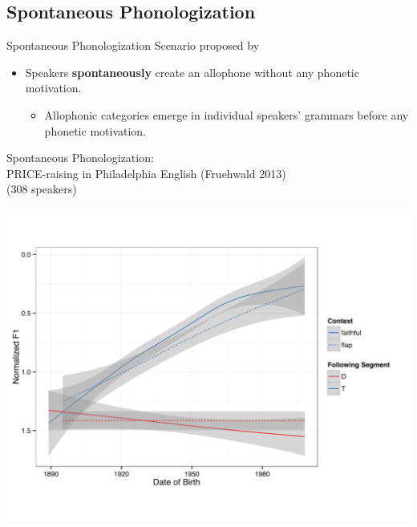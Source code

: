 \documentclass[hyperref={pdfpagelabels=false}]{beamer}
\begin{document}
\subsection{Spontaneous Phonologization}

\begin{frame}{Spontaneous Phonologization}
	Scenario proposed by \citet{JandaJoseph2003, fruehwald2013} 
	
	\begin{itemize}
		\item Speakers \textbf{spontaneously} create an allophone without any phonetic motivation.  \\
		\begin{itemize}
			\item Allophonic categories emerge in individual speakers' grammars before any phonetic motivation.
		\end{itemize}
	\end{itemize}
\end{frame}

\begin{frame}{Spontaneous Phonologization: \\ \small{PRICE-raising in Philadelphia English (Fruehwald 2013)\\(308 speakers)}}

	
\begin{center}
\includegraphics[trim=2cm 2cm 2cm 2cm, clip=false, width=.8\textwidth]{ayraisingphila.pdf}
\end{center}

\end{frame}
\end{document}
